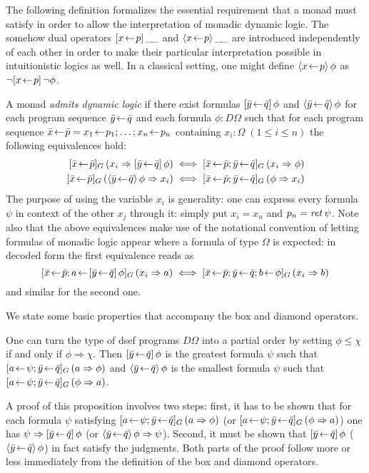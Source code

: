 The following definition formalizes the essential requirement that a monad must
satisfy in order to allow the interpretation of monadic dynamic logic. The
somehow dual operators $[x\!\gets\! p]\,\_\!\_$ and $\langle x\!\gets\! p\rangle\,\_\!\_$ are
introduced independently of each other in order to make their particular
interpretation possible in intuitionistic logics as well. In a classical setting,
one might define $\langle x\!\gets\! p\rangle\,{\phi}$ as $\lnot [x\!\gets\! p]\,\lnot \phi$.
\begin{defn}
  A monad \emph{admits dynamic logic} if there exist formulas $[\bar
    y\!\gets\! \bar q]\,\phi$ and $\langle\bar y\!\gets\! \bar q\rangle\,\phi$ for each program
  sequence $\bar y\!\gets\! \bar q$ and each formula $\phi : D\Omega$ such that for each program
  sequence $\bar x\!\gets\! \bar p = x_1\!\gets\! p_1; \ldots; x_n\!\gets\! p_n$ containing
  $x_i : \Omega \; (1\leq i\leq n)$ the following equivalences hold:
  \begin{align*}
    \Gdj{\bar x\leteq \bar p}(x_i \Rightarrow \PDLBox{\bar y\leteq\bar q}\phi)
      &\iff \Gdj{\bar x\leteq \bar p; \bar y\leteq\bar q}(x_i \Rightarrow \phi) \\
    \Gdj{\bar x\leteq\bar p}(\PDLDmd{\bar y\leteq\bar q}\phi \Rightarrow x_i)
      &\iff \Gdj{\bar x\leteq\bar p; \bar y\leteq\bar q}(\phi \Rightarrow x_i)
  \end{align*}
  The purpose of using the variable $x_i$ is  generality: one can express
  every formula $\psi$ in context of the other $x_j$ through it: simply put $x_i =
  x_n$ and $p_n = \mathit{ret\,} \psi$. Note also that the above equivalences make use of the
  notational convention of letting formulas of monadic logic appear where a
  formula of type $\Omega$ is expected: in decoded form the first equivalence reads
  as 
  \[  \Gdj{\bar x\leteq \bar p; a\leteq \PDLBox{\bar y\leteq\bar q}\phi}(x_i \Rightarrow a)
  \iff \Gdj{\bar x\leteq \bar p; \bar y\leteq\bar q; b\leteq \phi}(x_i \Rightarrow b) \]
  and similar for the second one.
\end{defn}

We state some basic properties that accompany the box and diamond operators.
\begin{prop}
  One can turn the type of dsef programs $D\Omega$ into a partial order by setting $\phi
  \leq \chi$ if and only if $\phi \Rightarrow \chi$. Then $[\bar y\!\gets\!\bar q]\,\phi$ is the
  greatest formula $\psi$ such that 
  $[a\!\gets\! \psi; \bar y\!\gets\!\bar q]_G\,(a\Rightarrow\phi)$
  and $\langle\bar y\!\gets\!\bar q\rangle\,\phi$ is the smallest formula $\psi$ such that 
  $[a\!\gets\! \psi; \bar y\!\gets\!\bar q]_G\,(\phi\Rightarrow a)$.
\end{prop}
A proof of this proposition involves two steps: first, it has to be shown that
for each formula $\psi$ satisfying $[a\!\gets\! \psi; \bar y\!\gets\!\bar q]_G\,(a\Rightarrow\phi)$ (or
$[a\!\gets\! \psi; \bar y\!\gets\!\bar q]_G\,(\phi\Rightarrow a)$) one has $\psi \Rightarrow [\bar y\!\gets\!\bar
  q]\,\phi$ (or $\langle\bar y\!\gets\!\bar q\rangle\,\phi \Rightarrow \psi$). Second, it must be shown that
$[\bar y\!\gets\!\bar q]\,\phi$ ($\langle\bar y\!\gets\!\bar q\rangle\,\phi$) in fact satisfy
the judgments. Both parts of the proof follow more or less immediately from the
definition of the box and diamond operators.


